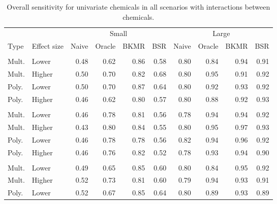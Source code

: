 \documentclass[12pt, twoside]{amherstthesis}
\begin{document}
\begin{table}

\caption{\label{tab:onewaytabsens}Overall sensitivity for univariate chemicals in all scenarios with interactions between chemicals.}
\centering
\begin{tabular}[t]{llrrrrrrrr}
\toprule
\multicolumn{2}{c}{ } & \multicolumn{4}{c}{Small} & \multicolumn{4}{c}{Large} \\
\cmidrule(l{3pt}r{3pt}){3-6} \cmidrule(l{3pt}r{3pt}){7-10}
Type & Effect size & Naive & Oracle & BKMR & BSR & Naive & Oracle & BKMR & BSR\\
\midrule
\addlinespace[0.3em]
\multicolumn{10}{l}{\textbf{Hg-Ni}}\\
\hspace{1em}Mult. & Lower & 0.48 & 0.62 & 0.86 & 0.58 & 0.80 & 0.84 & 0.94 & 0.91\\
\hspace{1em}Mult. & Higher & 0.50 & 0.70 & 0.82 & 0.68 & 0.80 & 0.95 & 0.91 & 0.92\\
\hspace{1em}Poly. & Lower & 0.50 & 0.70 & 0.87 & 0.64 & 0.80 & 0.92 & 0.93 & 0.92\\
\hspace{1em}Poly. & Higher & 0.46 & 0.62 & 0.80 & 0.57 & 0.80 & 0.88 & 0.92 & 0.93\\
\addlinespace[0.3em]
\multicolumn{10}{l}{\textbf{Cd-As}}\\
\hspace{1em}Mult. & Lower & 0.46 & 0.78 & 0.81 & 0.56 & 0.78 & 0.94 & 0.94 & 0.92\\
\hspace{1em}Mult. & Higher & 0.43 & 0.80 & 0.84 & 0.55 & 0.80 & 0.95 & 0.97 & 0.93\\
\hspace{1em}Poly. & Lower & 0.46 & 0.78 & 0.78 & 0.56 & 0.82 & 0.94 & 0.96 & 0.92\\
\hspace{1em}Poly. & Higher & 0.46 & 0.76 & 0.82 & 0.52 & 0.78 & 0.93 & 0.94 & 0.90\\
\addlinespace[0.3em]
\multicolumn{10}{l}{\textbf{Ni-Co}}\\
\hspace{1em}Mult. & Lower & 0.49 & 0.65 & 0.85 & 0.60 & 0.80 & 0.84 & 0.95 & 0.92\\
\hspace{1em}Mult. & Higher & 0.52 & 0.73 & 0.81 & 0.60 & 0.79 & 0.94 & 0.93 & 0.91\\
\hspace{1em}Poly. & Lower & 0.52 & 0.67 & 0.85 & 0.64 & 0.80 & 0.89 & 0.93 & 0.89\\

\end{tabular}
\end{table}
\end{document}
